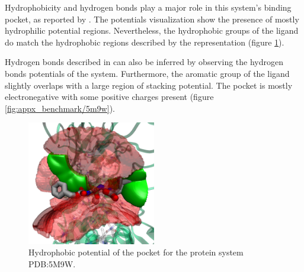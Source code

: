       Hydrophobicity and hydrogen bonds play a major role in this system's binding pocket, as reported by \cite{hydrophobic_2017}. The potentials visualization show the presence of mostly hydrophilic potential regions. Nevertheless, the hydrophobic groups of the ligand do match the hydrophobic regions described by the representation (figure \ref{fig:benchmark/5m9w}).

      Hydrogen bonds described in \cite{hydrophobic_2017} can also be inferred by observing the hydrogen bonds potentials of the system. Furthermore, the aromatic group of the ligand slightly overlaps with a large region of stacking potential. The pocket is mostly electronegative with some positive charges present (figure \ref{fig:appx_benchmark/5m9w}).

      \begin{figure}[H]
        \centering
        \includegraphics[width=0.5\textwidth]{figures/results/benchmark_prot/5m9w.png}
        \caption{\label{fig:benchmark/5m9w} Hydrophobic potential of the pocket for the protein system PDB:5M9W.}
      \end{figure}
    \pagebreak

